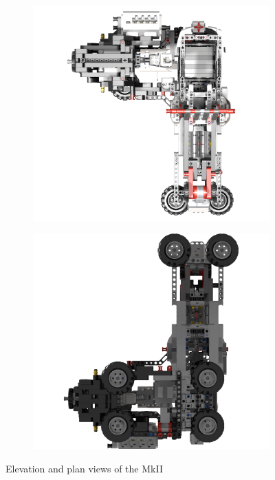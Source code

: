 \documentclass{report}
\begin{document}
\begin{figure}[H]
\begin{subfigure}[b]{0.275\textwidth}
    		\caption{}
    		\label{fig:rdrMkIIElevation4}
    	\end{subfigure}
    	\hspace{10mm}
    	\begin{subfigure}[b]{0.275\textwidth}
    		\includegraphics[width=\textwidth]{Resources/Images/rdrMkIIElevation5.png}
    		\caption{}
    		\label{fig:rdrMkIIElevation5}
    	\end{subfigure}
		\hspace{10mm}
		\begin{subfigure}[b]{0.275\textwidth}
			\includegraphics[width=\textwidth]{Resources/Images/rdrMkIIElevation6.png}
			\caption{}
			\label{fig:rdrMkIIElevation6}
		\end{subfigure}
    	\caption{Elevation and plan views of the MkII}
    	\label{fig:rdrMkIIElevations}
    \end{figure}
\end{document}

